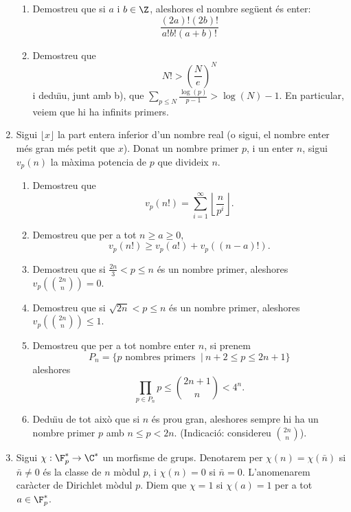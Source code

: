 \begin{enumerate}[leftmargin=*]
\begin{enumerate}
\item   Demostreu que si $a$ i $b\in\Z$, aleshores el nombre
seg\"{u}ent és enter: $$ \frac{(2a)!(2b)!}{a!b!(a+b)!}$$

\item  Demostreu que
$$N!>\left( \frac {N}{e}\right)^N$$
i dedu\"{\i}u, junt amb b), que $\sum_{p\le
N} \frac{\log(p)}{p-1} > \log(N)-1$. En particular, veiem que hi ha infinits primers.
\end{enumerate}


\item Sigui $\lfloor x \rfloor$ la part entera inferior d'un
nombre real (o sigui, el nombre enter més gran més petit que $x$).
Donat un nombre primer $p$, i un enter $n$, sigui $v_p(n)$ la màxima
potencia de $p$ que divideix $n$.

\begin{enumerate}


\item  Demostreu que $$v_p(n!)=\sum_{i=1}^{\infty} \left\lfloor
\frac n{p^i}\right\rfloor.$$

\item  Demostreu que per a tot $n\ge a\ge 0$,  $$v_p(n!)\ge
v_p(a!)+v_p((n-a)!).$$

\item  Demostreu que si  $\frac{2n}3< p\le n$ és un nombre
primer, aleshores $v_p(\binom{2n}{n})=0$.

\item  Demostreu que si  $\sqrt{2n}< p\le n$ és un nombre
primer, aleshores $v_p(\binom{2n}{n})\le 1$.

\item  Demostreu que per a tot nombre enter $n$, si prenem
\[
P_n=\{p \mbox{ nombres primers } \ | \ n+2\le p \le 2n+1\}
\]
aleshores
\[
\prod_{p\in P_n} p \le \binom{2n+1}{n}< 4^n.
\]

\item  Dedu\"{\i}u de tot això que si $n$ és prou gran,
aleshores sempre hi ha un nombre primer $p$ amb $n\le p<2n$.
(Indicació: considereu $\binom{2n}{n}$).

\end{enumerate}


\item Sigui $\chi:\F_p^* \to \C^*$ un morfisme de grups.
Denotarem per $\chi(n)=\chi(\bar n)$ si $\bar n\ne 0$ és la classe
de $n$ mòdul $p$, i $\chi(n)=0$ si $\bar n=0$. L'anomenarem caràcter
de Dirichlet mòdul $p$. Diem que $\chi=1$ si $\chi(a)=1$ per a tot
$a\in \F_p^*$.

\begin{enumerate}



\end{enumerate}
\end{enumerate}
